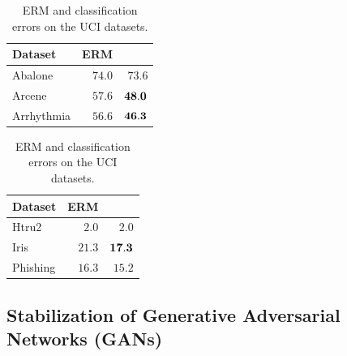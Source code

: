 \begin{table}
  \begin{center}
  \begin{tabular}{ l r r}
  \toprule
  Dataset & ERM &  \mixup{} \\
  \midrule
  Abalone    & $74.0$  & $   73.6$ \\
  Arcene     & $57.6$  & $\bf 48.0$ \\
  Arrhythmia & $56.6$ & $\bf  46.3$\\
  \bottomrule
  \end{tabular}
  \hspace{0.8cm}
  \begin{tabular}{ l r r}
      \toprule
      Dataset & ERM &  \mixup{} \\
      \midrule
      Htru2    & $ 2.0$  & $    2.0$ \\
      Iris     & $21.3$ & $\bf 17.3$ \\
      Phishing & $16.3$ & $    15.2$ \\
      \bottomrule
  \end{tabular}
  \end{center}
  \caption{ERM and \mixup{} classification errors on the UCI datasets.}
  \label{table:uci}
\end{table}

\subsection{Stabilization of Generative Adversarial Networks (GANs)}
\label{sec:gans}

